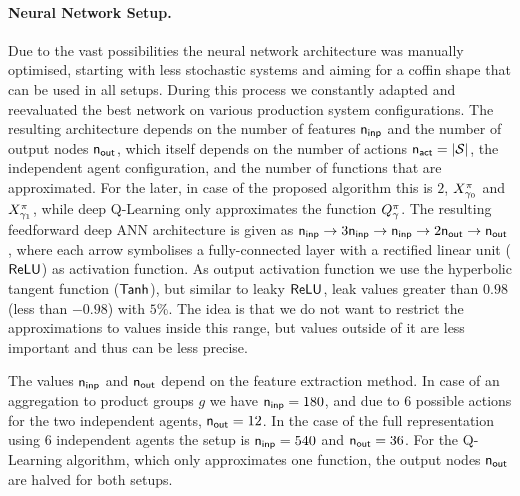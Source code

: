 \documentclass[envcountsame]{llncs}
\begin{document}
\paragraph*{Neural Network Setup.}
%
Due to the vast possibilities the neural network architecture was manually optimised, starting with
less stochastic systems and aiming for a coffin shape that can be used in all setups. During this
process we constantly adapted and reevaluated the best network on various production system
configurations. The resulting architecture depends on the number of features \(\mathsf{n_{inp}}\) and the
number of output nodes \(\mathsf{n_{out}}\), which itself depends on the number of actions
\(\mathsf{n_{act}} = \lvert{\mathcal{S}}\rvert\), the independent agent configuration, and the number of functions that
are approximated. For the later, in case of the proposed algorithm this is \(2\),
\(X^\pi_{\gamma_{0}}\) and \(X^\pi_{\gamma_{1}}\), while deep Q-Learning only approximates the
function \(Q_{\gamma}^\pi\).
%
The resulting feedforward deep ANN architecture is given as %
\(\anninp %
\rightarrow 3 \anninp %
\rightarrow \anninp %
\rightarrow 2 \annout %
\rightarrow \annout %
\), where each arrow symbolises a fully-connected layer with a rectified linear unit (\(\mathsf{ReLU}\)) as
activation function. As output activation function we use the hyperbolic tangent function
(\(\mathsf{Tanh}\)), but similar to leaky \(\mathsf{ReLU}\), leak values greater than \(0.98\) (less than \(-0.98\))
with \(5\%\). The idea is that we do not want to restrict the approximations to values inside this
range, but values outside of it are less important and thus can be less precise.

The values \(\mathsf{n_{inp}}\) and \(\mathsf{n_{out}}\) depend on the feature extraction method. In case of an
aggregation to product groups \(g\) we have \(\mathsf{n_{inp}}=180\), and due to \(6\) possible actions for
the two independent agents, \(\mathsf{n_{out}}=12\).
In the case of the full representation using 6 independent agents the setup is \(\mathsf{n_{inp}}=540\) and
\(\mathsf{n_{out}}=36\).
For the Q-Learning algorithm, which only approximates one function, the output nodes
\(\mathsf{n_{out}}\) are halved for both setups.
\end{document}

